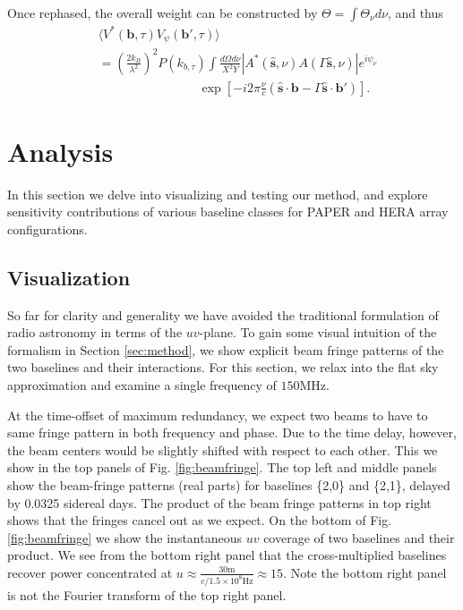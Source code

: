 \documentclass[twocolumn,apj,numberedappendix]{emulateapj}
\renewcommand\[{\begin{equation}}
\renewcommand\]{\end{equation}}
\begin{document}
Once rephased, the overall weight can be constructed by $\Theta=\int \Theta_{\nu}d\nu$, and thus
\begin{equation}
\begin{aligned} & \langle V^{*}(\boldsymbol{b},\tau)V_{\psi}(\boldsymbol{b'},\tau)\rangle\\
 & =\left(\frac{2k_{B}}{\lambda^{2}}\right)^{2}P(k_{b,\tau})\int\frac{d\Omega d\nu}{X^{2}Y}|A^{*}(\hat{\boldsymbol{s}},\nu)A(\Gamma\hat{\boldsymbol{s}},\nu)|e^{i\psi_{\nu}}\\
 & \qquad \qquad \qquad \qquad \exp\left[-i2\pi\frac{\nu}{c}\left(\hat{\boldsymbol{s}}\cdot\boldsymbol{b}-\Gamma\hat{\boldsymbol{s}}\cdot\boldsymbol{b'}\right)\right].\end{aligned}
\label{eq:final_new}
\end{equation}


\section{Analysis}

In this section we delve into visualizing and testing our method, and explore sensitivity contributions of various baseline classes for PAPER and HERA array configurations. 
\subsection{Visualization \label{sec:visual}}

So far for clarity and generality we have avoided the traditional formulation of radio astronomy in terms of the $uv$-plane. To gain some visual intuition of the formalism in Section \ref{sec:method}, we show explicit beam fringe patterns of the two baselines and their interactions. For this section, we relax into the flat sky approximation and examine a single frequency of $150$MHz. 

At the time-offset of maximum redundancy, we expect two beams to have to same fringe pattern in both frequency and phase. Due to the time delay, however, the beam centers would be slightly shifted with respect to each other. This we show in the top panels of Fig. \ref{fig:beamfringe}. The top left and middle panels show the beam-fringe
patterns (real parts) for baselines \{2,0\} and \{2,1\}, delayed by 0.0325 sidereal days.
The product of the beam fringe patterns in top right shows that the fringes
 cancel out as we expect. On the bottom of Fig. \ref{fig:beamfringe} we show the instantaneous $uv$ coverage of two baselines and their product. We see from the bottom right panel that the cross-multiplied baselines recover  power concentrated at $u\approx\frac{30\text{m}}{c/1.5\times10^8\text{Hz}}\approx15$. Note the bottom right panel is not the Fourier transform of the top right panel. 
\end{document}
